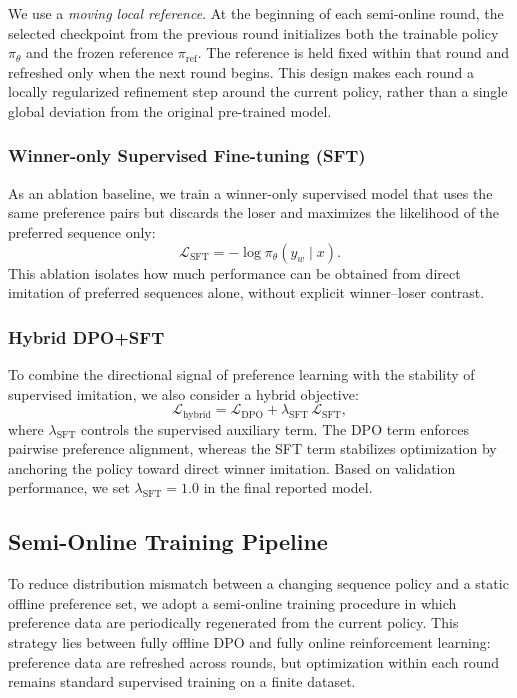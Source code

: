 \documentclass[pdflatex,sn-mathphys-num]{sn-jnl}%
\theoremstyle{thmstyleone}%
\theoremstyle{thmstyletwo}%
\theoremstyle{thmstylethree}%
\begin{document}
We use a \emph{moving local reference}. At the beginning of each semi-online round, the selected checkpoint from the previous round initializes both the trainable policy $\pi_\theta$ and the frozen reference $\pi_{\mathrm{ref}}$. The reference is held fixed within that round and refreshed only when the next round begins. This design makes each round a locally regularized refinement step around the current policy, rather than a single global deviation from the original pre-trained model.

\subsubsection{Winner-only Supervised Fine-tuning (SFT)}

As an ablation baseline, we train a winner-only supervised model that uses the same preference pairs but discards the loser and maximizes the likelihood of the preferred sequence only:
\begin{equation}
\mathcal{L}_{\mathrm{SFT}} = -\log \pi_\theta(y_w \mid x).
\end{equation}
This ablation isolates how much performance can be obtained from direct imitation of preferred sequences alone, without explicit winner--loser contrast.

\subsubsection{Hybrid DPO+SFT}

To combine the directional signal of preference learning with the stability of supervised imitation, we also consider a hybrid objective:
\begin{equation}
\mathcal{L}_{\mathrm{hybrid}} =
\mathcal{L}_{\mathrm{DPO}} + \lambda_{\mathrm{SFT}}\, \mathcal{L}_{\mathrm{SFT}},
\end{equation}
where $\lambda_{\mathrm{SFT}}$ controls the supervised auxiliary term. The DPO term enforces pairwise preference alignment, whereas the SFT term stabilizes optimization by anchoring the policy toward direct winner imitation. Based on validation performance, we set $\lambda_{\mathrm{SFT}}=1.0$ in the final reported model.

\subsection{Semi-Online Training Pipeline}\label{sec:training}

To reduce distribution mismatch between a changing sequence policy and a static offline preference set, we adopt a semi-online training procedure in which preference data are periodically regenerated from the current policy. This strategy lies between fully offline DPO and fully online reinforcement learning: preference data are refreshed across rounds, but optimization within each round remains standard supervised training on a finite dataset.
\end{document}
